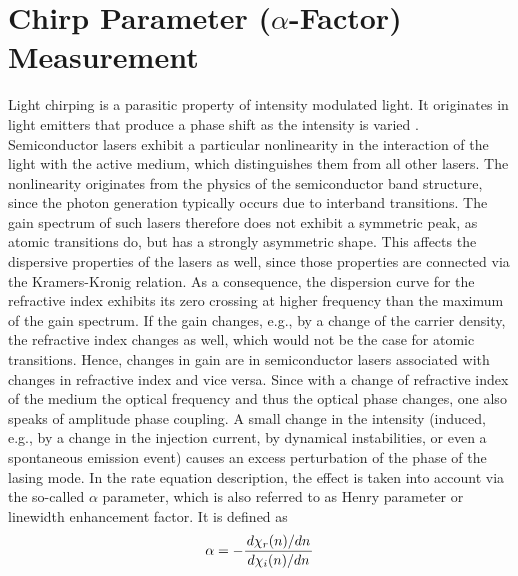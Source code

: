 \section{Chirp Parameter ($\alpha$-Factor) Measurement}
Light chirping is a parasitic property of intensity modulated light. It originates in light emitters that produce a phase shift as the intensity is varied \cite{devaux1993simple}. Semiconductor lasers exhibit a particular nonlinearity in the interaction of the light with the active medium, which distinguishes them from all other lasers. The nonlinearity originates from the physics of the semiconductor band structure, since the photon generation typically occurs due to interband transitions. The gain spectrum of such lasers therefore does not exhibit a symmetric peak, as atomic transitions do, but has a strongly asymmetric shape. This affects the dispersive properties of the lasers as well, since those properties are connected via the Kramers-Kronig relation. As a consequence, the dispersion curve for the refractive index exhibits its zero crossing at higher frequency than the maximum of the gain spectrum. If the gain changes, e.g., by a change of the carrier density, the refractive index changes as well, which would not be the case for atomic transitions. Hence, changes in gain are in semiconductor lasers associated with changes in refractive index and vice versa. Since with a change of refractive index of the medium the optical frequency and thus the optical phase changes, one also speaks of amplitude phase coupling. A small change in the intensity (induced, e.g., by a change in the injection current, by dynamical instabilities, or even a spontaneous emission event) causes an excess perturbation of the phase of the lasing mode. In the rate equation description, the effect is taken into account via the so-called $\alpha$ parameter, which is also referred to as Henry parameter or linewidth enhancement factor. It is defined as
\begin{equation}
    \alpha=-\frac{\dv*{\chi_r(n)}{n}}{\dv*{\chi_i(n)}{n}}
\end{equation}

